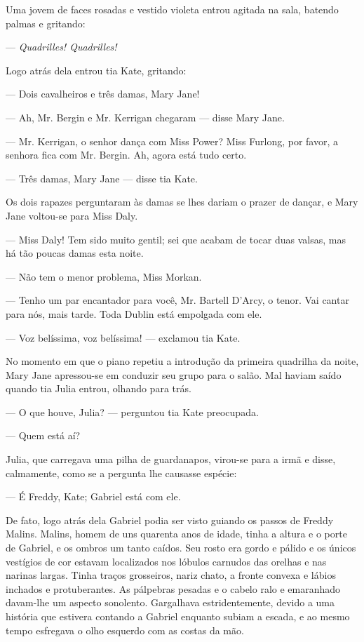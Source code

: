 Uma jovem de faces rosadas e vestido violeta entrou agitada na sala,
batendo palmas e gritando:

--- \textit{Quadrilles! Quadrilles!}

Logo atrás dela entrou tia Kate, gritando:

--- Dois cavalheiros e três damas, Mary Jane!

--- Ah, Mr. Bergin e Mr. Kerrigan chegaram --- disse Mary Jane.

--- Mr. Kerrigan, o senhor dança com Miss Power? Miss Furlong, por
favor, a senhora fica com Mr. Bergin. Ah, agora está tudo certo.

--- Três damas, Mary Jane --- disse tia Kate.

Os dois rapazes perguntaram às damas se lhes dariam o prazer de
dançar, e Mary Jane voltou-se para Miss Daly.

--- Miss Daly! Tem sido muito gentil; sei que acabam de tocar duas
valsas, mas há tão poucas damas esta noite.

--- Não tem o menor problema, Miss Morkan.

--- Tenho um par encantador para você, Mr. Bartell D'Arcy, o tenor.
Vai cantar para nós, mais tarde. Toda Dublin está empolgada com
ele.

--- Voz belíssima, voz belíssima! --- exclamou tia Kate.

No momento em que o piano repetiu a introdução da primeira quadrilha
da noite, Mary Jane apressou-se em conduzir seu grupo para o salão.
Mal haviam saído quando tia Julia entrou, olhando para trás.

--- O que houve, Julia? --- perguntou tia Kate preocupada.

--- Quem está aí?

Julia, que carregava uma pilha de guardanapos, virou-se para a irmã e
disse, calmamente, como se a pergunta lhe causasse
espécie:

--- É Freddy, Kate; Gabriel está com ele.

De fato, logo atrás dela Gabriel podia ser visto guiando os passos de
Freddy Malins. Malins, homem de uns quarenta anos de idade, tinha a
altura e o porte de Gabriel, e os ombros um tanto caídos. Seu rosto
era gordo e pálido e os únicos vestígios de cor estavam localizados
nos lóbulos carnudos das orelhas e nas narinas largas. Tinha traços
grosseiros, nariz chato, a fronte convexa e lábios inchados e
protuberantes. As pálpebras pesadas e o cabelo ralo e emaranhado
davam-lhe um aspecto sonolento. Gargalhava estridentemente, devido a
uma história que estivera contando a Gabriel enquanto subiam a escada,
e ao mesmo tempo esfregava o olho esquerdo com as costas da mão.

